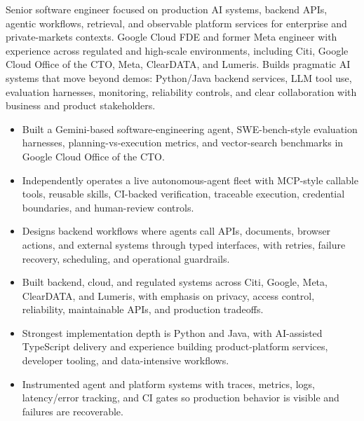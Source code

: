 


Senior software engineer focused on production AI systems, backend APIs, agentic workflows, retrieval, and observable platform services for enterprise and private-markets contexts. Google Cloud FDE and former Meta engineer with experience across regulated and high-scale environments, including Citi, Google Cloud Office of the CTO, Meta, ClearDATA, and Lumeris. Builds pragmatic AI systems that move beyond demos: Python/Java backend services, LLM tool use, evaluation harnesses, monitoring, reliability controls, and clear collaboration with business and product stakeholders.
\begin{itemize}
  \item Built a Gemini-based software-engineering agent, SWE-bench-style evaluation harnesses, planning-vs-execution metrics, and vector-search benchmarks in Google Cloud Office of the CTO.
  \item Independently operates a live autonomous-agent fleet with MCP-style callable tools, reusable skills, CI-backed verification, traceable execution, credential boundaries, and human-review controls.
  \item Designs backend workflows where agents call APIs, documents, browser actions, and external systems through typed interfaces, with retries, failure recovery, scheduling, and operational guardrails.
\end{itemize}
\begin{itemize}
  \item Built backend, cloud, and regulated systems across Citi, Google, Meta, ClearDATA, and Lumeris, with emphasis on privacy, access control, reliability, maintainable APIs, and production tradeoffs.
  \item Strongest implementation depth is Python and Java, with AI-assisted TypeScript delivery and experience building product-platform services, developer tooling, and data-intensive workflows.
  \item Instrumented agent and platform systems with traces, metrics, logs, latency/error tracking, and CI gates so production behavior is visible and failures are recoverable.
\end{itemize}





